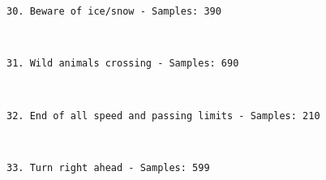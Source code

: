 \documentclass[11pt]{article}
\begin{document}
    \begin{Verbatim}[commandchars=\\\{\}]
30. Beware of ice/snow - Samples: 390

    \end{Verbatim}

    \begin{center}
    \end{center}
    { \hspace*{\fill} \\}
    
    \begin{Verbatim}[commandchars=\\\{\}]
31. Wild animals crossing - Samples: 690

    \end{Verbatim}

    \begin{center}
    \end{center}
    { \hspace*{\fill} \\}
    
    \begin{Verbatim}[commandchars=\\\{\}]
32. End of all speed and passing limits - Samples: 210

    \end{Verbatim}

    \begin{center}
    \end{center}
    { \hspace*{\fill} \\}
    
    \begin{Verbatim}[commandchars=\\\{\}]
33. Turn right ahead - Samples: 599

    \end{Verbatim}

    \begin{center}
    \end{center}
    { \hspace*{\fill} \\}
    
\end{document}
